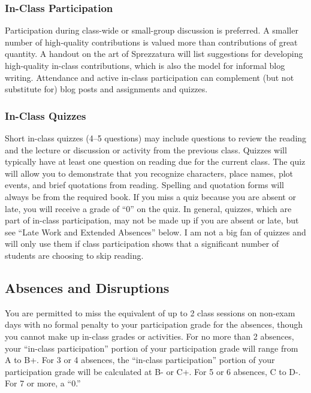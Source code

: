 \documentclass[]{article}
\begin{document}
\subsubsection{In-Class Participation}\label{in-class-participation}

Participation during class-wide or small-group discussion is preferred.
A smaller number of high-quality contributions is valued more than
contributions of great quantity. A handout on the art of Sprezzatura
will list suggestions for developing high-quality in-class
contributions, which is also the model for informal blog writing.
Attendance and active in-class participation can complement (but not
substitute for) blog posts and assignments and quizzes.

\subsubsection{In-Class Quizzes}\label{in-class-quizzes}

Short in-class quizzes (4--5 questions) may include questions to review
the reading and the lecture or discussion or activity from the previous
class. Quizzes will typically have at least one question on reading due
for the current class. The quiz will allow you to demonstrate that you
recognize characters, place names, plot events, and brief quotations
from reading. Spelling and quotation forms will always be from the
required book. If you miss a quiz because you are absent or late, you
will receive a grade of ``0'' on the quiz. In general, quizzes, which
are part of in-class participation, may not be made up if you are absent
or late, but see ``Late Work and Extended Absences'' below. I am not a
big fan of quizzes and will only use them if class participation shows
that a significant number of students are choosing to skip reading.

\subsection{Absences and Disruptions}\label{absences-and-disruptions}

You are permitted to miss the equivalent of up to 2 class sessions on
non-exam days with no formal penalty to your participation grade for the
absences, though you cannot make up in-class grades or activities. For
no more than 2 absences, your ``in-class participation'' portion of your
participation grade will range from A to B+. For 3 or 4 absences, the
``in-class participation'' portion of your participation grade will be
calculated at B- or C+. For 5 or 6 absences, C to D-. For 7 or more, a
``0.''
\end{document}
